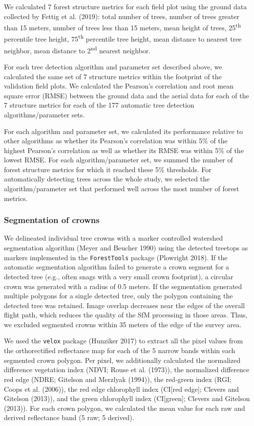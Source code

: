 \documentclass[]{article}
\begin{document}
We calculated 7 forest structure metrics for each field plot using the
ground data collected by Fettig et al. (2019): total number of trees,
number of trees greater than 15 meters, number of trees less than 15
meters, mean height of trees, 25\textsuperscript{th} percentile tree
height, 75\textsuperscript{th} percentile tree height, mean distance to
nearest tree neighbor, mean distance to 2\textsuperscript{nd} nearest
neighbor.

For each tree detection algorithm and parameter set described above, we
calculated the same set of 7 structure metrics within the footprint of
the validation field plots. We calculated the Pearson's correlation and
root mean square error (RMSE) between the ground data and the aerial
data for each of the 7 structure metrics for each of the 177 automatic
tree detection algorithms/parameter sets.

For each algorithm and parameter set, we calculated its performance
relative to other algorithms as whether its Pearson's correlation was
within 5\% of the highest Pearson's correlation as well as whether its
RMSE was within 5\% of the lowest RMSE. For each algorithm/parameter
set, we summed the number of forest structure metrics for which it
reached these 5\% thresholds. For automatically detecting trees across
the whole study, we selected the algorithm/parameter set that performed
well across the most number of forest metrics.

\subsubsection{Segmentation of crowns}\label{segmentation-of-crowns}

We delineated individual tree crowns with a marker controlled watershed
segmentation algorithm (Meyer and Beucher 1990) using the detected
treetops as markers implemented in the \texttt{ForestTools} package
(Plowright 2018). If the automatic segmentation algorithm failed to
generate a crown segment for a detected tree (e.g., often snags with a
very small crown footprint), a circular crown was generated with a
radius of 0.5 meters. If the segmentation generated multiple polygons
for a single detected tree, only the polygon containing the detected
tree was retained. Image overlap decreases near the edges of the overall
flight path, which reduces the quality of the SfM processing in those
areas. Thus, we excluded segmented crowns within 35 meters of the edge
of the survey area.

We used the \texttt{velox} package (Hunziker 2017) to extract all the
pixel values from the orthorectified reflectance map for each of the 5
narrow bands within each segmented crown polygon. Per pixel, we
additionally calculated the normalized difference vegetation index
(NDVI; Rouse et al. (1973)), the normalized difference red edge (NDRE;
Gitelson and Merzlyak (1994)), the red-green index (RGI; Coops et al.
(2006)), the red edge chlorophyll index (CI{[}red edge{]}; Clevers and
Gitelson (2013)), and the green chlorophyll index (CI{[}green{]};
Clevers and Gitelson (2013)). For each crown polygon, we calculated the
mean value for each raw and derived reflectance band (5 raw; 5 derived).
\end{document}
